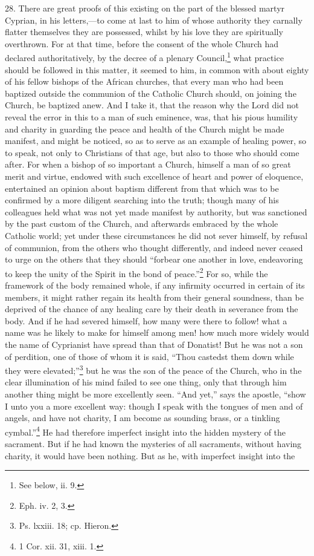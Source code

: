 28. There are great proofs of this existing on the part of the blessed martyr Cyprian, in his letters,—to come at last to him of whose authority they carnally flatter themselves they are possessed, whilst by his love they are spiritually overthrown. For at that time, before the consent of the whole Church had declared authoritatively, by the decree of a plenary Council,\footnote{\par  See below, ii. 9.} what practice should be followed in this matter, it seemed to him, in common with about eighty of his fellow bishops of the African churches, that every man who had been baptized outside the communion of the Catholic Church should, on joining the Church, be baptized anew. And I take it, that the reason why the Lord did not reveal the error in this to a man of such eminence, was, that his pious humility and charity in guarding the peace and health of the Church might be made manifest, and might be noticed, so as to serve as an example of healing power, so to speak, not only to Christians of that age, but also to those who should come after. For when a bishop of so important a Church, himself a man of so great merit and virtue, endowed with such excellence of heart and power of eloquence, entertained an opinion about baptism different from that which was to be confirmed by a more diligent searching into the truth; though many of his colleagues held what was not yet made manifest by authority, but was sanctioned by the past custom of the Church, and afterwards embraced by the whole Catholic world; yet under these circumstances he did not sever himself, by refusal of communion, from the others who thought differently, and indeed never ceased to urge on the others that they should ``forbear one another in love, endeavoring to keep the unity of the Spirit in the bond of peace.''\footnote{\par  Eph. iv. 2, 3.} For so, while the framework of the body remained whole, if any infirmity occurred in certain of its members, it might rather regain its health from their general soundness, than be deprived of the chance of any healing care by their death in severance from the body. And if he had severed himself, how many were there to follow! what a name was he likely to make for himself among men! how much more widely would the name of Cyprianist have spread than that of Donatist! But he was not a son of perdition, one of those of whom it is said, ``Thou castedst them down while they were elevated;''\footnote{\par  Ps. lxxiii. 18; cp. Hieron.} but he was the son of the peace of the Church, who in the clear illumination of his mind failed to see one thing, only that through him another thing might be more excellently seen. ``And yet,'' says the apostle, ``show I unto you a more excellent way: though I speak with the tongues of men and of angels, and have not charity, I am become as sounding brass, or a tinkling cymbal.''\footnote{\par  1 Cor. xii. 31, xiii. 1.} He had therefore imperfect insight into the hidden mystery of the sacrament. But if he had known the mysteries of all sacraments, without having charity, it would have been nothing. But as he, with imperfect insight into the 